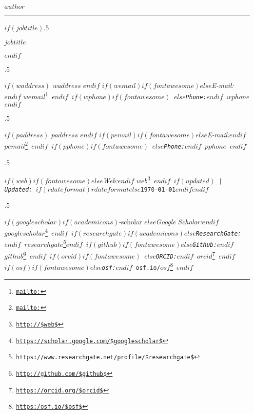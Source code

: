 \documentclass[$if(fontsize)$$fontsize$,$endif$$if(lang)$$babel-lang$,$endif$$if(papersize)$$papersize$paper,$endif$$for(classoption)$$classoption$$sep$,$endfor$]{$documentclass$}
\renewcommand{\href}[2]{#2\footnote{\url{#1}}}
\begin{document}
\thispagestyle{firstpage} %

\centerline{\huge \bf $author$}

\vspace{2 mm}

\hrule

\vspace{4 mm}

$if(jobtitle)$\moveleft.5\hoffset\centerline{$jobtitle$}$endif$

\moveleft.5\hoffset\centerline{$if(waddress)$ $waddress$ $endif$ $if(wemail)$$if(fontawesome)$\faEnvelopeO \hspace{1 mm}$else$\emph{E-mail:}$endif$ \href{mailto:}{\tt $wemail$} \hspace{1 mm}$endif$ $if(wphone)$$if(fontawesome)$ \faPhone \hspace{1 mm}$else$\emph{Phone:}$endif$ $wphone$ $endif$} 

\moveleft.5\hoffset\centerline{$if(paddress)$ $paddress$ $endif$ $if(pemail)$$if(fontawesome)$\faEnvelopeO \hspace{1 mm}$else$\emph{E-mail:}$endif$ \href{mailto:}{\tt $pemail$} \hspace{1 mm}$endif$ $if(pphone)$$if(fontawesome)$ \faPhone \hspace{1 mm}$else$\emph{Phone:}$endif$ $pphone$ $endif$} 

\moveleft.5\hoffset\centerline{ $if(web)$$if(fontawesome)$\faGlobe \hspace{1 mm}$else$\emph{Web:}$endif$ \href{http://$web$}{\tt $web$} \hspace{1 mm} $endif$ $if(updated)$ | \emph{Updated:} $if(rdateformat)$$rdateformat$$else$\apstylekinda\today$endif$$endif$}

\moveleft.5\hoffset\centerline{ $if(googlescholar)$$if(academicons)$\aigoogle-scholar \hspace{.5 mm}$else$\emph{Google Scholar:}$endif$ \href{https://scholar.google.com/$googlescholar$}{\tt $googlescholar$} \hspace{1 mm}$endif$ $if(researchgate)$$if(academicons)$\airesearchgate \hspace{.5 mm}$else$\emph{ResearchGate:}$endif$ \href{https://www.researchgate.net/profile/$researchgate$}{\tt $researchgate$}$endif$ $if(github)$$if(fontawesome)$\faGithub \hspace{1 mm}$else$\emph{Github:}$endif$ \href{http://github.com/$github$}{\tt $github$} \hspace{1 mm}$endif$ $if(orcid)$$if(fontawesome)$ \hspace{.5 mm}$else$\emph{ORCID:}$endif$ \href{https://orcid.org/$orcid$}{\tt $orcid$} \hspace{1 mm}$endif$ $if(osf)$$if(fontawesome)$\faUnlock \hspace{1 mm}$else$\emph{osf:}$endif$ \href{https:/osf.io/$osf$}{\tt osf.io/$osf$} $endif$}
\end{document}
